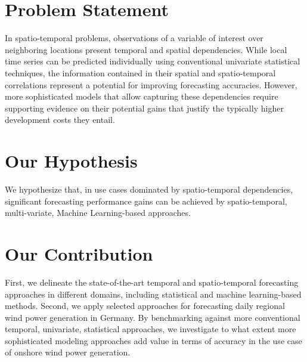 \section{Problem Statement}
In spatio-temporal problems, observations of a variable of interest over neighboring locations present temporal and spatial dependencies.
While local time series can be predicted individually using conventional univariate statistical techniques, the information contained in their spatial and spatio-temporal correlations represent a potential for improving forecasting accuracies.
However, more sophisticated models that allow capturing these dependencies require supporting evidence on their potential gains that justify the typically higher development costs they entail.

\section{Our Hypothesis}
We hypothesize that, in use cases dominated by spatio-temporal dependencies, significant forecasting performance gains can be achieved by spatio-temporal, multi-variate, Machine Learning-based approaches.

\section{Our Contribution}
First, we delineate the state-of-the-art temporal and spatio-temporal forecasting approaches in different domains, including statistical and machine learning-based methods.
Second, we apply selected approaches for forecasting daily regional wind power generation in Germany.
By benchmarking against more conventional temporal, univariate, statistical approaches, we investigate to what extent more sophisticated modeling approaches add value in terms of accuracy in the use case of onshore wind power generation.
